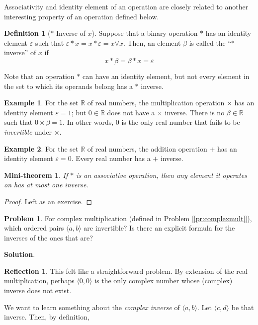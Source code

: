 \documentclass[english,notitlepage,smartquotes]{hgbreport}
\theoremstyle{definition}
\newtheorem{definition}{Definition}
\theoremstyle{definition}
\newtheorem{problem}{Problem}
\theoremstyle{remark}
\theoremstyle{definition}
\newtheorem{example}{Example}
\theoremstyle{plain}
\newtheorem{mini-theorem}{Mini-theorem}
\theoremstyle{definition}
\newtheorem{reflection}{Reflection}
\begin{document}
Associativity and identity element of an operation are closely related to another interesting property of an operation defined below.

\begin{definition}[$*$ Inverse of $x$] 
Suppose that a binary operation $*$ has an identity element $\varepsilon$ such that $\varepsilon*x=x*\varepsilon=x\forall x$. Then, an element $\beta$ is called the ``$*$ inverse'' of $x$ if 
$$
x*\beta=\beta*x=\varepsilon
$$
\label{def:*-inverse}
\end{definition}

Note that an operation $*$ can have an identity element, but not every element in the set to which its operands belong has a $*$ inverse.
\begin{example} For the set $\mathbb{R}$ of real numbers, the multiplication operation $\times$ has an identity element $\varepsilon=1$; but $0\in\mathbb{R}$ does not have a $\times$ inverse. There is no $\beta\in\mathbb{R}$ such that $0\times\beta=1$. In other words, $0$ is the only real number that fails to be \emph{invertible} under $\times$. 
\end{example}
\begin{example} For the set $\mathbb{R}$ of real numbers, the addition operation $+$ has an identity element $\varepsilon=0$. Every real number has a $+$ inverse.
\end{example}
\begin{mini-theorem}
If $*$ is an associative operation, then any element it operates on has at most one inverse.
\end{mini-theorem}
\begin{proof}
Left as an exercise.
\end{proof}

\begin{problem}
\label{pr:complexinv}
For complex multiplication (defined in Problem [\ref{pr:complexmult}]), which ordered pairs $\langle a,b\rangle$ are invertible? Is there an explicit formula for the inverses of the ones that are?
\end{problem}

\textbf{Solution}.

\begin{reflection}
This felt like a straightforward problem. By extension of the real multiplication, perhaps $\langle 0,0\rangle$ is the only complex number whose (complex) inverse does not exist.
\end{reflection}

We want to learn something about the \emph{complex inverse} of $\langle a,b\rangle$. Let $\langle c,d\rangle$ be that inverse. Then, by definition,
\end{document}
